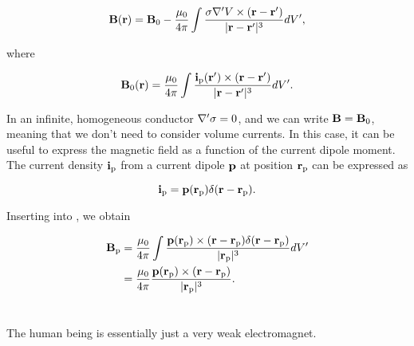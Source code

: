 {\begin{equation}\label{eq:MEG:ampere-laplace-split}
{\bf B}({\bf r}) = {\bf B}_\mathrm{0} - \frac{\mu_0}{4\pi} \int \frac{\sigma {\bf \nabla}' V \times ({\bf r} - {\bf r}')}{|{\bf r} - {\bf r}'|^3} dV',
\end{equation}

where 

\begin{equation}\label{eq:MEG:B0}
{\bf B}_0({\bf r}) = \frac{\mu_0}{4\pi} \int \frac{ {\bf i}_\mathrm{p}({\bf r}') \times ({\bf r} - {\bf r}')}{|{\bf r} - {\bf r}'|^3} dV'.
\end{equation}

In an infinite, homogeneous conductor ${\bf \nabla}'\sigma = 0$, and we can write ${\bf B} = {\bf B}_\mathrm{0}$, meaning that we don't need to consider volume currents. In this case, it can be useful to express the magnetic field as a function of the current dipole moment. The current density ${\bf i}_\mathrm{p}$ from a current dipole ${\bf p}$ at position ${\bf r}_\mathrm{p}$ can be expressed as

\begin{equation}\label{eq:MEG:i_dipole}
{\bf i}_\mathrm{p} = {\bf p}({\bf r}_\mathrm{p}) \delta ({\bf r} - {\bf r}_\mathrm{p}).
\end{equation}

Inserting  into , we obtain

\begin{align}
{\bf B}_\mathrm{p} &= \frac{\mu_0}{4 \pi} \int \frac{{\bf p}({\bf r}_\mathrm{p}) \times ({\bf r} - {\bf r}_\mathrm{p}) \delta ({\bf r} - {\bf r}_\mathrm{p})}{|{\bf r}_\mathrm{p}|^3} dV' \\
&= \frac{\mu_0}{4 \pi} \frac{{\bf p}({\bf r}_\mathrm{p}) \times ({\bf r} - {\bf r}_\mathrm{p})}{|{\bf r}_\mathrm{p}|^3}.
\end{align}


}


\section{ }
The human being is essentially just a very weak electromagnet. 